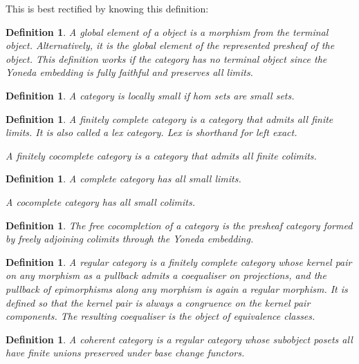 \documentclass{tufte-book}
\newtheorem{definition}[theorem]{Definition}
\begin{document}
 This is best rectified by knowing this definition:
 
 \begin{definition}
     A global element of a object is a morphism from the terminal object. Alternatively, it is the global element of the represented presheaf of the object. This definition works if the category has no terminal object since the Yoneda embedding is fully faithful and preserves all limits.
 \end{definition}
 
 \begin{definition}
     A category is locally small if hom sets are small sets.
 \end{definition}
 
 \begin{definition}
     A finitely complete category is a category that admits all finite limits. It is also called a lex category. Lex is shorthand for left exact. 
 
     A finitely cocomplete category is a category that admits all finite colimits.
 \end{definition}
 
 \begin{definition}
     A complete category has all small limits.
 
     A cocomplete category has all small colimits.
 \end{definition}
 
 \begin{definition}
     The free cocompletion of a category is the presheaf category formed by freely adjoining colimits through the Yoneda embedding.
 \end{definition}
 
 \begin{definition}
     A regular category is a finitely complete category whose kernel pair on any morphism as a pullback admits a coequaliser on projections, and the pullback of epimorphisms along any morphism is again a regular morphism. It is defined so that the kernel pair is always a congruence on the kernel pair components. The resulting coequaliser is the object of equivalence classes.
 \end{definition}
 
 \begin{definition}
     A coherent category is a regular category whose subobject posets all have finite unions preserved under base change functors.
 \end{definition}
 
\end{document}
